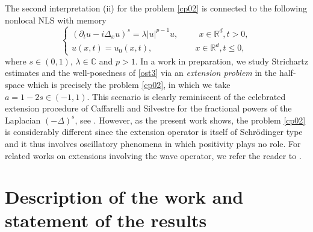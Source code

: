 \documentclass[11pt,letter]{amsart}
\newcommand{\Rd}{\mathbb R^d}
\newcommand{\p}{\partial}
\newcommand{\la}{\lambda}
\numberwithin{equation}{section}
\newcommand{\C}{\mathbb{C}}
\numberwithin{equation}{section}
\begin{document}
The second interpretation (ii) for the problem \eqref{cp02} is connected to the following nonlocal NLS with memory
\begin{equation}\label{ost3}
\begin{cases}
(\p_t u - i \Delta_x u)^{s}  = \la |u|^{p-1} u,\ \ \ \ \ \ \ \ \ \ \ x\in \Rd, t>0,
\\
u(x,t) = u_0(x,t),\ \ \ \ \ \ \ \ \ \ \ \ \ \ \ \ \ \ \ \ \ \ \ x\in \Rd, t\le 0,
\end{cases}
\end{equation}
where $s\in (0,1)$, $\la\in \C$ and $p>1$. 
In a work in preparation, we study Strichartz estimates and the well-posedness of \eqref{ost3} via an \emph{extension problem} in the half-space which is precisely the problem \eqref{cp02}, 
in which we take $a = 1-2s\in (-1,1)$. 
This scenario is clearly reminiscent of the celebrated extension procedure of Caffarelli and Silvestre for the fractional powers of the Laplacian $(-\Delta)^s$, see \cite{CS}. However, as the present work shows, the problem \eqref{cp02} is considerably different since the extension operator is itself of Schr\"odinger type and it thus involves oscillatory phenomena in which positivity plays no role. For related works on extensions involving the wave operator, we refer the reader to \cite{KST, EGV}.



\section{Description of the work and statement of the results} 
\end{document}
